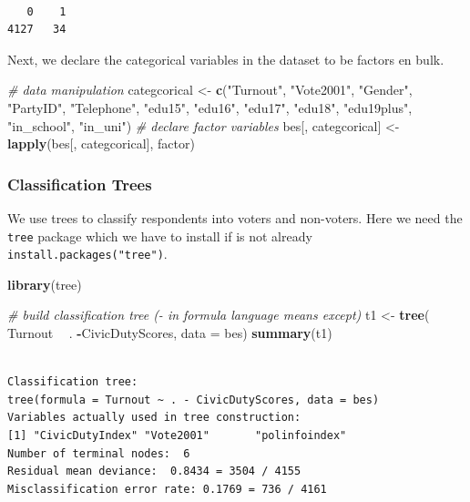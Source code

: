 \documentclass[]{article}
\newenvironment{Shaded}{\begin{snugshade}}{\end{snugshade}}
\newcommand{\CommentTok}[1]{\textcolor[rgb]{0.56,0.35,0.01}{\textit{#1}}}
\newcommand{\DataTypeTok}[1]{\textcolor[rgb]{0.13,0.29,0.53}{#1}}
\newcommand{\KeywordTok}[1]{\textcolor[rgb]{0.13,0.29,0.53}{\textbf{#1}}}
\newcommand{\NormalTok}[1]{#1}
\newcommand{\OperatorTok}[1]{\textcolor[rgb]{0.81,0.36,0.00}{\textbf{#1}}}
\newcommand{\StringTok}[1]{\textcolor[rgb]{0.31,0.60,0.02}{#1}}
\begin{document}
\begin{verbatim}

   0    1 
4127   34 
\end{verbatim}

Next, we declare the categorical variables in the dataset to be factors en bulk.

\begin{Shaded}
\begin{Highlighting}[]
\CommentTok{# data manipulation}
\NormalTok{categcorical <-}\StringTok{ }\KeywordTok{c}\NormalTok{(}\StringTok{"Turnout"}\NormalTok{, }\StringTok{"Vote2001"}\NormalTok{, }\StringTok{"Gender"}\NormalTok{, }\StringTok{"PartyID"}\NormalTok{, }\StringTok{"Telephone"}\NormalTok{, }\StringTok{"edu15"}\NormalTok{,}
                  \StringTok{"edu16"}\NormalTok{, }\StringTok{"edu17"}\NormalTok{, }\StringTok{"edu18"}\NormalTok{, }\StringTok{"edu19plus"}\NormalTok{, }\StringTok{"in_school"}\NormalTok{, }\StringTok{"in_uni"}\NormalTok{)}
\CommentTok{# declare factor variables}
\NormalTok{bes[, categcorical] <-}\StringTok{ }\KeywordTok{lapply}\NormalTok{(bes[, categcorical], factor)}
\end{Highlighting}
\end{Shaded}

\hypertarget{classification-trees}{%
\subsubsection{Classification Trees}\label{classification-trees}}

We use trees to classify respondents into voters and non-voters. Here we need the \texttt{tree} package which we have to install if is not already \texttt{install.packages("tree")}.

\begin{Shaded}
\begin{Highlighting}[]
\KeywordTok{library}\NormalTok{(tree)}

\CommentTok{# build classification tree (- in formula language means except)}
\NormalTok{t1 <-}\StringTok{ }\KeywordTok{tree}\NormalTok{( Turnout }\OperatorTok{~}\StringTok{ }\NormalTok{. }\OperatorTok{-}\NormalTok{CivicDutyScores, }\DataTypeTok{data =}\NormalTok{ bes)}
\KeywordTok{summary}\NormalTok{(t1)}
\end{Highlighting}
\end{Shaded}

\begin{verbatim}

Classification tree:
tree(formula = Turnout ~ . - CivicDutyScores, data = bes)
Variables actually used in tree construction:
[1] "CivicDutyIndex" "Vote2001"       "polinfoindex"  
Number of terminal nodes:  6 
Residual mean deviance:  0.8434 = 3504 / 4155 
Misclassification error rate: 0.1769 = 736 / 4161 
\end{verbatim}
\end{document}

